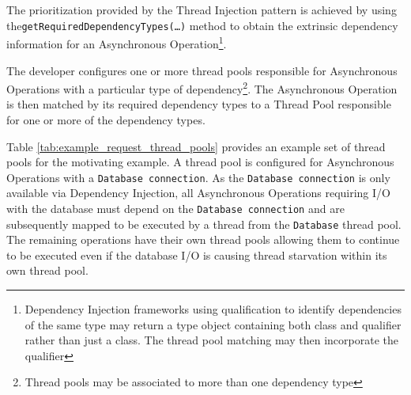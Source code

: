 \documentclass[prodmode]{style/acmlarge}
\begin{document}
The prioritization provided by the Thread Injection pattern is achieved by using
the\texttt{getRequiredDependencyTypes(\ldots)} method to obtain the extrinsic
dependency information for an Asynchronous Operation\footnote{Dependency
Injection frameworks using qualification to identify dependencies of the same
type may return a type object containing both class and qualifier rather than
just a class.  The thread pool matching may then incorporate the qualifier}.

The developer configures one or more thread pools responsible for Asynchronous
Operations with a particular type of dependency\footnote{Thread pools may be
associated to more than one dependency type}.  The Asynchronous Operation is
then matched by its required dependency types to a Thread Pool responsible for
one or more of the dependency types. 

Table \ref{tab:example_request_thread_pools} provides an example set of thread
pools for the motivating example.  A thread pool is configured for Asynchronous
Operations with a \texttt{Database connection}.  As the \texttt{Database
connection} is only available via Dependency Injection, all Asynchronous
Operations requiring I/O with the database must depend on the \texttt{Database
connection} and are subsequently mapped to be executed by a thread from the
\texttt{Database} thread pool.  The remaining operations have their own thread
pools allowing them to continue to be executed even if the database I/O is
causing thread starvation within its own thread pool.

\begin{table}[t]
\label{tab:example_request_thread_pools}
\end{table}
\end{document}

